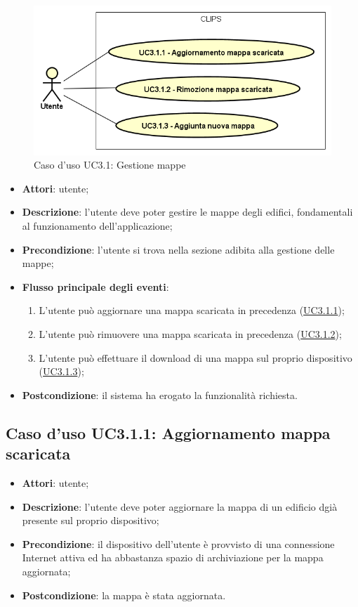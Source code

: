 \documentclass[../AnalisiDeiRequisiti.tex]{subfiles}
\begin{document}
        \begin{figure}[!h]
            \centering
            \includegraphics[scale=0.95, width=\textwidth]{img/UC3-1.png}
            \caption{Caso d'uso UC3.1: Gestione mappe}\label{fig:UC3.1} 
        \end{figure}
\begin{itemize}
\item \textbf{Attori}: utente;
\item \textbf{Descrizione}: l'utente deve poter gestire le mappe degli edifici, fondamentali al funzionamento dell'applicazione; 
      \item \textbf{Precondizione}: l'utente si trova nella sezione adibita alla gestione delle mappe;

        \item \textbf{Flusso principale degli eventi}:
          \begin{enumerate}
          \item L'utente può aggiornare una mappa scaricata in precedenza (\hyperlink{UC3.1.1}{UC3.1.1});
          \item L'utente può rimuovere una mappa scaricata in precedenza (\hyperlink{UC3.1.2}{UC3.1.2});
          \item L'utente può effettuare il download di una mappa sul proprio dispositivo (\hyperlink{UC3.1.3}{UC3.1.3});

      \end{enumerate}
    \item \textbf{Postcondizione}: il sistema ha erogato la funzionalità richiesta.
  \end{itemize}
\hypertarget{UC3.1.1}{}
\subsection{Caso d'uso UC3.1.1: Aggiornamento mappa scaricata}
\begin{itemize}
\item \textbf{Attori}: utente;

\item \textbf{Descrizione}: l'utente deve poter aggiornare la mappa di un edificio dgià presente sul proprio dispositivo; 
      \item \textbf{Precondizione}: il dispositivo dell'utente è provvisto di una connessione Internet attiva ed ha abbastanza spazio di archiviazione per la mappa aggiornata;
    \item \textbf{Postcondizione}: la mappa è stata aggiornata.
  \end{itemize}
\hypertarget{UC3.1.2}{}
\end{document}
